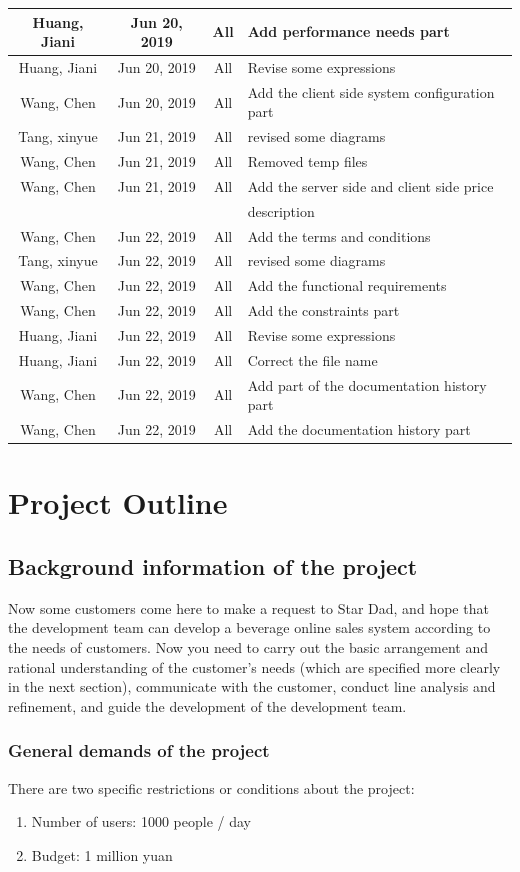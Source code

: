 \documentclass[a4paper]{report}
\begin{document}
\begin{tabular}{|c|c|c|l|}
\hline
Huang, Jiani&Jun 20, 2019&All&Add performance needs part\\
\hline
Huang, Jiani&Jun 20, 2019&All&Revise some expressions\\
\hline
Wang, Chen&Jun 20, 2019&All&Add the client side system configuration part\\
\hline
Tang, xinyue&Jun 21, 2019&All&revised some diagrams\\
\hline 
Wang, Chen&Jun 21, 2019&All&Removed temp files\\
\hline
Wang, Chen&Jun 21, 2019&All&Add the server side and client side price \\
& & &description\\
\hline
Wang, Chen&Jun 22, 2019&All&Add the terms and conditions\\
\hline
Tang, xinyue&Jun 22, 2019&All&revised some diagrams\\
\hline 
Wang, Chen&Jun 22, 2019&All&Add the functional requirements\\
\hline
Wang, Chen&Jun 22, 2019&All&Add the constraints part\\
\hline
Huang, Jiani&Jun 22, 2019&All&Revise some expressions\\
\hline
Huang, Jiani&Jun 22, 2019&All&Correct the file name\\
\hline
Wang, Chen&Jun 22, 2019&All&Add part of the documentation history part\\
\hline
Wang, Chen&Jun 22, 2019&All&Add the documentation history part\\
\hline
\end{tabular}

\chapter{Project Outline}
\section{Background information of the project}
Now some customers come here to make a request to Star Dad, and hope that the development team can develop a beverage online sales system according to the needs of customers. Now you need to carry out the basic arrangement and rational understanding of the customer's needs (which are specified more clearly in the next section), communicate with the customer, conduct line analysis and refinement, and guide the development of the development team.
\par
\subsection{General demands of the project}
There are two specific restrictions or conditions about the project:
\begin{enumerate}
\item
Number of users: 1000 people / day
\item
Budget: 1 million yuan

\end{enumerate}
\end{document}
